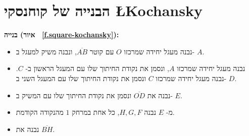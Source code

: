 
\newpage

\section{הבנייה של קוחנסקי
\L{\normalsize Kochansky}}\label{s.square-kochanski}

\textbf{%
בנייה (איור%
~\ref{f.square-kochansky}):}
\begin{itemize}
\item
נבנה מעגל יחידה שמרכזו 
$O$
עם קוטר
$\overline{AB}$,
ונבנה משיק למעגל ב-%
$A$.
\item
נבנה מעגל יחידה שמרכזו
$A$,
ונסמן את נקודת החיתוך שלו עם המעגל הראשון ב-%
$C$.
נבנה מעגל יחידה שמרכזו 
$C$
ונסמן את נקודת החיתוך שלו עם המעגל השני ב-%
$D$. 
\item
נבנה את
$\overline{OD}$
ונסמן את נקודת החיתוך שלו עם המשיק ב-%
$E$.
\item
מ-%
$E$
נבנה
$H,G,F$,
כל אחת במרחק 
$1$
מהנקודה הקודמת.
\item
נבנה את
$\overline{BH}$.
\end{itemize}

